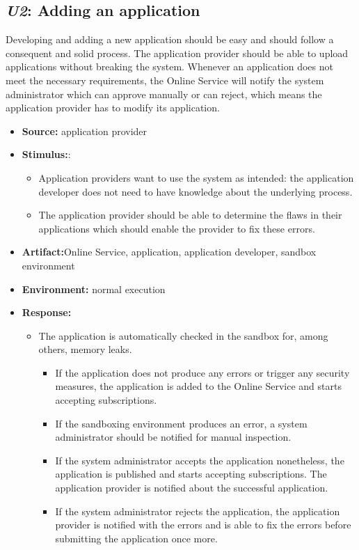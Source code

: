 \documentclass[english]{sareport}
\begin{document}
\subsection{\emph{U2}: Adding an application}
Developing and adding a new application should be easy and should follow a consequent and solid process. The application provider should be able to upload applications without breaking the system. Whenever an application does not meet the necessary requirements, the Online Service will notify the system administrator which can approve manually or can reject, which means the application provider has to modify its application.

\begin{itemize}
    \item \textbf{Source:} application provider
    \item \textbf{Stimulus:}: 
    \begin{itemize}
    \item Application providers want to use the system as intended: the application developer does not need to have knowledge about the underlying process.
    \item The application provider should be able to determine the flaws in their applications which should enable the provider to fix these errors.
    \end{itemize}
    \item \textbf{Artifact:}Online Service, application, application developer, sandbox environment
    \item \textbf{Environment:} normal execution
    \item \textbf{Response:}
        \begin{itemize}
            \item The application is automatically checked in the sandbox for, among others, memory leaks.
            \begin{itemize} 
            \item If the application does not produce any errors or trigger any security measures, the application is added to the Online Service and starts accepting subscriptions.
            \item If the sandboxing environment produces an error, a system administrator should be notified for manual inspection.
            \item If the system administrator accepts the application nonetheless, the application is published and starts accepting subscriptions. The application provider is notified about the successful application.
            \item If the system administrator rejects the application, the application provider is notified with the errors and is able to fix the errors before submitting the application once more.
            \end{itemize}
        \end{itemize}


\end{itemize}
\end{document}
